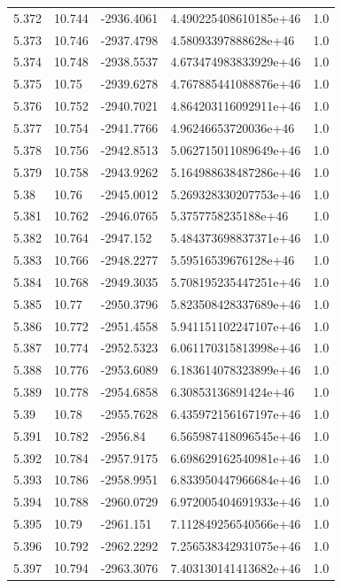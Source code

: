 \begin{tabular}{lllll}
5.372 & 10.744 & -2936.4061 & 4.490225408610185e+46 & 1.0 \\
5.373 & 10.746 & -2937.4798 & 4.58093397888628e+46 & 1.0 \\
5.374 & 10.748 & -2938.5537 & 4.673474983833929e+46 & 1.0 \\
5.375 & 10.75 & -2939.6278 & 4.767885441088876e+46 & 1.0 \\
5.376 & 10.752 & -2940.7021 & 4.864203116092911e+46 & 1.0 \\
5.377 & 10.754 & -2941.7766 & 4.96246653720036e+46 & 1.0 \\
5.378 & 10.756 & -2942.8513 & 5.062715011089649e+46 & 1.0 \\
5.379 & 10.758 & -2943.9262 & 5.164988638487286e+46 & 1.0 \\
5.38 & 10.76 & -2945.0012 & 5.269328330207753e+46 & 1.0 \\
5.381 & 10.762 & -2946.0765 & 5.3757758235188e+46 & 1.0 \\
5.382 & 10.764 & -2947.152 & 5.484373698837371e+46 & 1.0 \\
5.383 & 10.766 & -2948.2277 & 5.59516539676128e+46 & 1.0 \\
5.384 & 10.768 & -2949.3035 & 5.708195235447251e+46 & 1.0 \\
5.385 & 10.77 & -2950.3796 & 5.823508428337689e+46 & 1.0 \\
5.386 & 10.772 & -2951.4558 & 5.941151102247107e+46 & 1.0 \\
5.387 & 10.774 & -2952.5323 & 6.061170315813998e+46 & 1.0 \\
5.388 & 10.776 & -2953.6089 & 6.183614078323899e+46 & 1.0 \\
5.389 & 10.778 & -2954.6858 & 6.30853136891424e+46 & 1.0 \\
5.39 & 10.78 & -2955.7628 & 6.435972156167197e+46 & 1.0 \\
5.391 & 10.782 & -2956.84 & 6.565987418096545e+46 & 1.0 \\
5.392 & 10.784 & -2957.9175 & 6.698629162540981e+46 & 1.0 \\
5.393 & 10.786 & -2958.9951 & 6.833950447966684e+46 & 1.0 \\
5.394 & 10.788 & -2960.0729 & 6.972005404691933e+46 & 1.0 \\
5.395 & 10.79 & -2961.151 & 7.112849256540566e+46 & 1.0 \\
5.396 & 10.792 & -2962.2292 & 7.256538342931075e+46 & 1.0 \\
5.397 & 10.794 & -2963.3076 & 7.403130141413682e+46 & 1.0 \\

\end{tabular}
